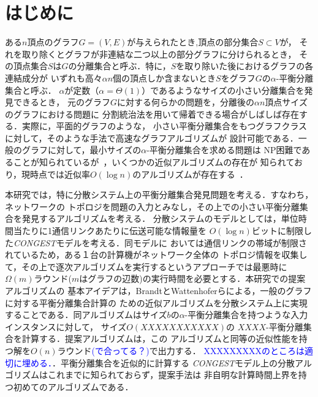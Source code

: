 \documentclass{thesis}
\theoremstyle{definition}
\newcommand{\Izumi}[1]{\textcolor{blue}{#1}}
\begin{document}
\baselineskip=22pt
\pagestyle{empty}

\maketitle

\pagestyle{myheadings}	%
\tableofcontents

\newpage


\chapter{はじめに}

ある$n$頂点のグラフ$G=(V,E)$が与えられたとき,頂点の部分集合$S \subset V$が，
それを取り除くとグラフが非連結な二つ以上の部分グラフに分けられるとき，
その頂点集合$S$は$G$の分離集合と呼ぶ．特に，$S$を取り除いた後におけるグラフの各連結成分が
いずれも高々$\alpha n$個の頂点しか含まないとき$S$をグラフ$G$の$\alpha$-平衡分離集合と呼ぶ．
$\alpha$が定数（$\alpha = \Theta(1)$）であるようなサイズの小さい分離集合を発見できるとき，
元のグラフ$G$に対する何らかの問題を，分離後の$\alpha n$頂点サイズのグラフにおける問題に
分割統治法を用いて帰着できる場合がしばしば存在する．実際に，平面的グラフのような，
小さい平衡分離集合をもつグラフクラスに対して，そのような手法で高速なグラフアルゴリズムが
設計可能である．一般のグラフに対して，最小サイズの$\alpha$-平衡分離集合を求める問題は
NP困難であることが知られているが~\cite{XXXX}，いくつかの近似アルゴリズムの存在が
知られており，現時点では近似率$O(\log n)$のアルゴリズムが存在する~\cite{}．

本研究では，特に分散システム上の平衡分離集合発見問題を考える．すなわち，ネットワークの
トポロジを問題の入力とみなし，その上での小さい平衡分離集合を発見するアルゴリズムを考える．
分散システムのモデルとしては，単位時間当たりに1通信リンクあたりに伝送可能な情報量を
$O(\log n)$ビットに制限した\textit{CONGEST}モデルを考える．同モデルに
おいては通信リンクの帯域が制限されているため，ある１台の計算機がネットワーク全体の
トポロジ情報を収集して，その上で逐次アルゴリズムを実行するというアプローチでは最悪時に
$\Omega(m)$ラウンド($m$はグラフの辺数)の実行時間を必要とする．本研究での提案アルゴリズムの
基本アイデアは，BrandtとWattenhoferらによる，一般のグラフに対する平衡分離集合計算の
ための近似アルゴリズム\cite{brandt2017approximating}を分散システム上に実現することである．同アルゴリズムはサイズ$b$の$\alpha$-平衡分離集合を持つような入力インスタンスに対して，
サイズ$O(XXXXXXXXXXX)$の $XXXX$-平衡分離集合を計算する．提案アルゴリズムは，この
アルゴリズムと同等の近似性能を持つ解を$O(n)$ラウンド\Izumi{(で合ってる？)}で出力する．
\Izumi{XXXXXXXXXのところは適切に埋める．}．平衡分離集合を近似的に計算する
\textit{CONGEST}モデル上の分散アルゴリズムはこれまでに知られておらず，提案手法は
非自明な計算時間上界を持つ初めてのアルゴリズムである．
\end{document}
